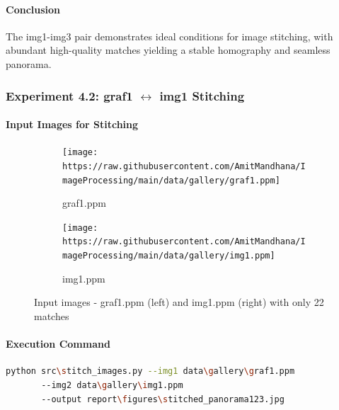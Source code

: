 \documentclass[12pt,a4paper]{article}
\begin{document}
\paragraph{Conclusion}
The img1-img3 pair demonstrates ideal conditions for image stitching, with abundant high-quality matches yielding a stable homography and seamless panorama.

\subsubsection{Experiment 4.2: graf1 $\leftrightarrow$ img1 Stitching}

\paragraph{Input Images for Stitching}

\begin{figure}[H]
\centering
\begin{subfigure}{0.45\textwidth}
\texttt{[image: https://raw.githubusercontent.com/AmitMandhana/ImageProcessing/main/data/gallery/graf1.ppm]}
\caption{graf1.ppm}
\end{subfigure}
\hfill
\begin{subfigure}{0.45\textwidth}
\texttt{[image: https://raw.githubusercontent.com/AmitMandhana/ImageProcessing/main/data/gallery/img1.ppm]}
\caption{img1.ppm}
\end{subfigure}
\caption{Input images - graf1.ppm (left) and img1.ppm (right) with only 22 matches}
\end{figure}

\paragraph{Execution Command}
\begin{lstlisting}[language=bash]
python src\stitch_images.py --img1 data\gallery\graf1.ppm 
       --img2 data\gallery\img1.ppm 
       --output report\figures\stitched_panorama123.jpg
\end{lstlisting}
\end{document}
